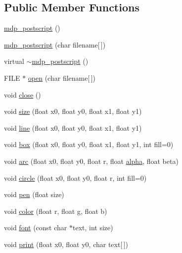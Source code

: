 \subsection*{Public Member Functions}
\begin{DoxyCompactItemize}
\item 
\hyperlink{classmdp__postscript_a30a69ecea648f202d533b02c8f21f119}{mdp\_\-postscript} ()
\item 
\hyperlink{classmdp__postscript_a94b381b18ec3bce5ab2ac9f0f33dcb53}{mdp\_\-postscript} (char filename\mbox{[}$\,$\mbox{]})
\item 
virtual \hyperlink{classmdp__postscript_a3a46d2757dc2954f970987cb3bea2784}{$\sim$mdp\_\-postscript} ()
\item 
FILE $\ast$ \hyperlink{classmdp__postscript_a2c2ab911f52c386532b769dda793dcdc}{open} (char filename\mbox{[}$\,$\mbox{]})
\item 
void \hyperlink{classmdp__postscript_af41a3aa09549d5acb2b5e9a098f69089}{close} ()
\item 
void \hyperlink{classmdp__postscript_af62e32c26c084b83e1a6c318767f2192}{size} (float x0, float y0, float x1, float y1)
\item 
void \hyperlink{classmdp__postscript_a99a00f3641062e5beef501f07baa7785}{line} (float x0, float y0, float x1, float y1)
\item 
void \hyperlink{classmdp__postscript_aa44192cb071b678edb48adb39053a396}{box} (float x0, float y0, float x1, float y1, int fill=0)
\item 
void \hyperlink{classmdp__postscript_a56092f2141d3d1b0cc4afd333bed5e1e}{arc} (float x0, float y0, float r, float \hyperlink{classmdp__postscript_aca4cc1e7bee7fa702c643bdb1c69d6d0}{alpha}, float beta)
\item 
void \hyperlink{classmdp__postscript_abfa4c3e6cfd19b2ddb190ca9a5f2df02}{circle} (float x0, float y0, float r, int fill=0)
\item 
void \hyperlink{classmdp__postscript_a416d831d67bb6db2512f3e819eee8bf3}{pen} (float size)
\item 
void \hyperlink{classmdp__postscript_ae4c5ce5c229ad7cfef67a689c77acac3}{color} (float r, float g, float b)
\item 
void \hyperlink{classmdp__postscript_a296dff78ebec7c38e3c39d97d3743172}{font} (const char $\ast$text, int size)
\item 
void \hyperlink{classmdp__postscript_a0c67b14a365475f3b5b04d3d033cc4c4}{print} (float x0, float y0, char text\mbox{[}$\,$\mbox{]})
\end{DoxyCompactItemize}
